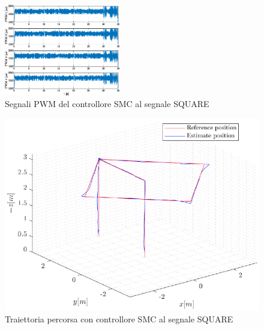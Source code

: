 \begin{figure}
	\centering
	\includegraphics[width=0.45\textwidth]{Simulazioni/Figure/SMC/SQUARE/PWM}
	\caption{Segnali PWM del controllore SMC al segnale SQUARE}
	\label{fig:SQUAREPWMSMC}
\end{figure}
\begin{figure}
	\centering
	\includegraphics[width=1\textwidth]{Simulazioni/Figure/SMC/SQUARE/Trajectory}
	\caption{Traiettoria percorsa con controllore SMC al segnale SQUARE}
	\label{fig:SQUAREtraSMC}
\end{figure}

